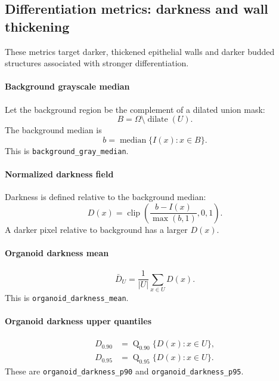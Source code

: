 \documentclass[11pt]{article}
\newcommand{\1}{\mathbf{1}}
\newcommand{\clip}{\operatorname{clip}}
\newcommand{\med}{\operatorname{median}}
\newcommand{\quantile}{\operatorname{Q}}
\newcommand{\dilate}{\operatorname{dilate}}
\newcommand{\unionmask}{U}
\newcommand{\gray}{I}
\begin{document}
\subsection{Differentiation metrics: darkness and wall thickening}
These metrics target darker, thickened epithelial walls and darker budded structures associated with stronger differentiation.

\paragraph{Background grayscale median}
Let the background region be the complement of a dilated union mask:
\begin{equation}
B = \Omega \setminus \dilate(\unionmask).
\end{equation}
The background median is
\begin{equation}
b = \med\{\gray(x): x\in B\}.
\end{equation}
This is \texttt{background\_gray\_median}.

\paragraph{Normalized darkness field}
Darkness is defined relative to the background median:
\begin{equation}
D(x) = \clip\left(\frac{b-\gray(x)}{\max(b,1)}, 0, 1\right).
\end{equation}
A darker pixel relative to background has a larger $D(x)$.

\paragraph{Organoid darkness mean}
\begin{equation}
\bar{D}_{\unionmask} = \frac{1}{|\unionmask|}\sum_{x\in\unionmask} D(x).
\end{equation}
This is \texttt{organoid\_darkness\_mean}.

\paragraph{Organoid darkness upper quantiles}
\begin{align}
D_{0.90} &= \quantile_{0.90}\{D(x):x\in\unionmask\},\\
D_{0.95} &= \quantile_{0.95}\{D(x):x\in\unionmask\}.
\end{align}
These are \texttt{organoid\_darkness\_p90} and \texttt{organoid\_darkness\_p95}.
\end{document}
